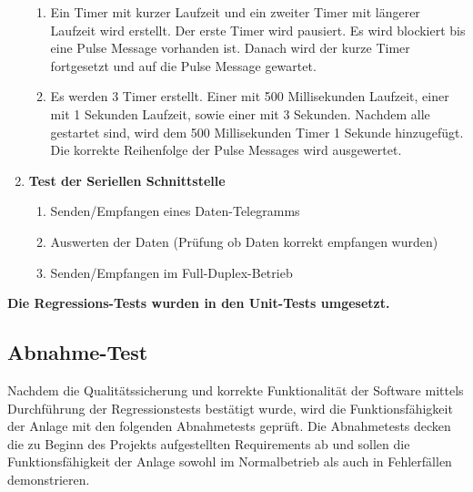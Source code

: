 \documentclass[oneside,a4paper,titlepage]{scrartcl}              %
\begin{document}
\begin{enumerate}
\begin{enumerate}
    \item Ein Timer mit kurzer Laufzeit und ein zweiter Timer mit längerer Laufzeit wird erstellt. Der erste Timer wird pausiert. Es wird blockiert bis eine Pulse Message vorhanden ist. Danach wird der kurze Timer fortgesetzt und auf die Pulse Message gewartet.
    \item Es werden 3 Timer erstellt. Einer mit 500 Millisekunden Laufzeit, einer mit 1 Sekunden Laufzeit, sowie einer mit 3 Sekunden. Nachdem alle gestartet sind, wird dem 500 Millisekunden Timer 1 Sekunde hinzugefügt. Die korrekte Reihenfolge der Pulse Messages wird ausgewertet.
  \end{enumerate}
  \item \textbf{Test der Seriellen Schnittstelle}
  \begin{enumerate}
    \item Senden/Empfangen eines Daten-Telegramms
    \item Auswerten der Daten (Prüfung ob Daten korrekt empfangen wurden)
    \item Senden/Empfangen im Full-Duplex-Betrieb
  \end{enumerate}
\end{enumerate}
\textbf{Die Regressions-Tests wurden in den Unit-Tests umgesetzt.}

\newpage

\subsection{Abnahme-Test}
Nachdem die Qualitätssicherung und korrekte Funktionalität der Software mittels Durchführung der Regressionstests bestätigt wurde, wird die Funktionsfähigkeit der Anlage mit den folgenden Abnahmetests geprüft. Die Abnahmetests decken die zu Beginn des Projekts aufgestellten Requirements ab und sollen die Funktionsfähigkeit der Anlage sowohl im Normalbetrieb als auch in Fehlerfällen demonstrieren.

\end{document}
